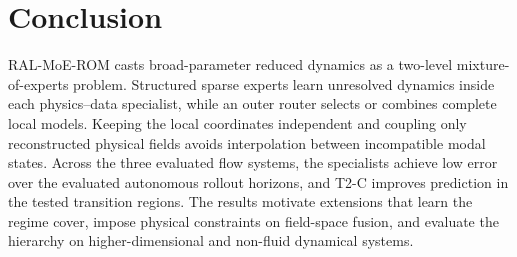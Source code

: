 \section{Conclusion}

RAL-MoE-ROM casts broad-parameter reduced dynamics as a two-level mixture-of-experts problem. Structured sparse experts learn unresolved dynamics inside each physics--data specialist, while an outer router selects or combines complete local models. Keeping the local coordinates independent and coupling only reconstructed physical fields avoids interpolation between incompatible modal states. Across the three evaluated flow systems, the specialists achieve low error over the evaluated autonomous rollout horizons, and T2-C improves prediction in the tested transition regions. The results motivate extensions that learn the regime cover, impose physical constraints on field-space fusion, and evaluate the hierarchy on higher-dimensional and non-fluid dynamical systems.
